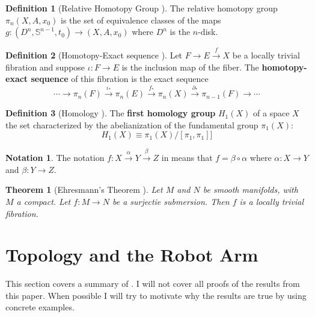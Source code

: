 \documentclass[12pt]{article}
\newtheorem{thm}{Theorem}
\theoremstyle{definition}
\newtheorem{defn}{Definition}
\newtheorem*{notation}{Notation}
\begin{document}
\begin{defn}[Relative Homotopy Group \cite{topology-fiber-bundles}]
    The relative homotopy group \(\pi_n(X,A,x_0)\) is the set of equivalence classes
    of the maps \(g : (D^n,\mathbb{S}^{n-1},t_0) \rightarrow (X, A, x_0)\)
    where \(D^n\) is the \(n\)-disk.
\end{defn}

\begin{defn}[Homotopy-Exact sequence \cite{topology-fiber-bundles}]
    Let \(F \rightarrow E \xrightarrow{f} X\) be a locally trivial fibration and suppose
    \(\iota : F \rightarrow E\) is the inclusion map of the fiber.
    The \textbf{homotopy-exact sequence} of this fibration is the exact sequence
    \[
        \cdots \rightarrow \pi_n(F) \xrightarrow{\iota_*} \pi_n(E) 
        \xrightarrow{f_*} \pi_n(X) \xrightarrow{\partial_*} \pi_{n-1}(F)
        \rightarrow \cdots
    \]
\end{defn}

\begin{defn}[Homology \cite{topology-fiber-bundles}]
    The \textbf{first homology group} \(H_1(X)\) of a space \(X\) the set
    characterized by the  abelianization of the fundamental group \(\pi_1(X)\):
    \[
        H_1(X) \equiv \pi_1(X)/[\pi_1,\pi_1]]
    \]
\end{defn}

\begin{notation}
    The notation
    \(f : X \xrightarrow{\alpha} Y \xrightarrow{\beta} Z\)
    in \cite{topology-robot-arm} means that \(f = \beta \circ \alpha\) where
    \(\alpha : X \rightarrow Y\) and \(\beta : Y \rightarrow Z\).
\end{notation}

\begin{thm}[Ehresmann's Theorem \cite{ehresmann}]
    Let \(M\) and \(N\) be smooth manifolds, with \(M\) a compact. 
    Let \(f : M \rightarrow N\) be a surjectie submersion. Then \(f\) is a
    locally trivial fibration.
\end{thm}

\section{Topology and the Robot Arm}
This section covers a summary of \cite{topology-robot-arm}. I will not cover
all proofs of the results from this paper. When possible I
will try to motivate why the results are true by using concrete examples.
\end{document}
